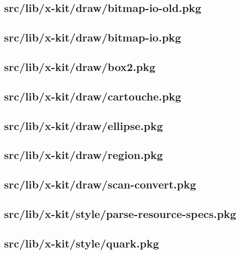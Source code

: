 \subsection{src/lib/x-kit/draw/bitmap-io-old.pkg}


\subsection{src/lib/x-kit/draw/bitmap-io.pkg}


\subsection{src/lib/x-kit/draw/box2.pkg}


\subsection{src/lib/x-kit/draw/cartouche.pkg}


\subsection{src/lib/x-kit/draw/ellipse.pkg}


\subsection{src/lib/x-kit/draw/region.pkg}


\subsection{src/lib/x-kit/draw/scan-convert.pkg}


\subsection{src/lib/x-kit/style/parse-resource-specs.pkg}


\subsection{src/lib/x-kit/style/quark.pkg}


